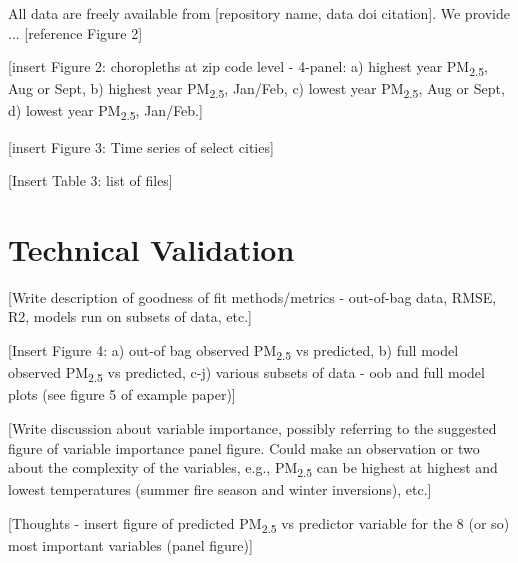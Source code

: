 \documentclass[english]{article}
\begin{document}

All data are freely available from [repository name, data doi citation]. We provide ... [reference Figure 2]

[insert Figure 2: choropleths at zip code level - 4-panel: a) highest year PM\textsubscript{2.5}, Aug or Sept, b) highest year PM\textsubscript{2.5}, Jan/Feb, c) lowest year PM\textsubscript{2.5}, Aug or Sept, d) lowest year PM\textsubscript{2.5}, Jan/Feb.] %

[insert Figure 3: Time series of select cities] %

[Insert Table 3: list of files]

\section*{Technical Validation}


[Write description of goodness of fit methods/metrics - out-of-bag data, RMSE, R2, models run on subsets of data, etc.]

[Insert Figure 4: a) out-of bag observed PM\textsubscript{2.5} vs predicted, b) full model observed PM\textsubscript{2.5} vs predicted, c-j) various subsets of data - oob and full model plots (see figure 5 of example paper)]

[Write discussion about variable importance, possibly referring to the suggested figure of variable importance panel figure. Could make an observation or two about the complexity of the variables, e.g., PM\textsubscript{2.5} can be highest at highest and lowest temperatures (summer fire season and winter inversions), etc.]

[Thoughts - insert figure of predicted PM\textsubscript{2.5} vs predictor variable for the 8 (or so) most important variables (panel figure)]
\end{document}
